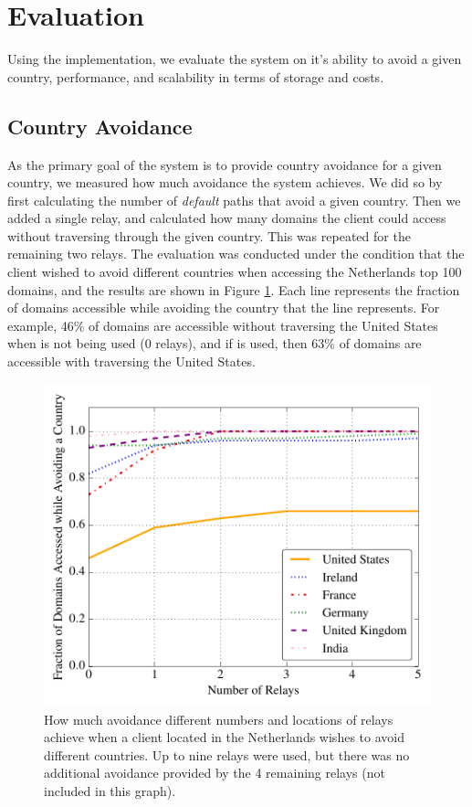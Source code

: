 \section{Evaluation}
Using the \system{} implementation, we evaluate the system on it's ability to avoid a given country, performance, and scalability in terms of storage and costs.

\subsection{Country Avoidance}
As the primary goal of the system is to provide country avoidance for a given 
country, we measured how much avoidance the system achieves.  We did so by first 
calculating the number of {\it default} paths that avoid a given country.  Then 
we added a single relay, and calculated how many domains the client could 
access without traversing through the given country.  This was repeated for 
the remaining two relays.  The evaluation was conducted under the condition that 
the client wished to avoid different countries when accessing the Netherlands top 
100 domains, and the results are shown in Figure \ref{fig:avoidance_eval}.  Each 
line represents the fraction of domains accessible while avoiding the country that 
the line represents.  For example, 46\% of domains are accessible without traversing 
the United States when \system{} is not being used (0 relays), and if \system{} is 
used, then 63\% of domains are accessible with traversing the United States.

\begin{figure}[b!]
\centering
\includegraphics[width=.5\textwidth]{avoidance_n_relays}
\caption{How much avoidance different numbers and locations of relays achieve when a 
client located in the Netherlands wishes to avoid different countries.  Up to nine 
relays were used, but there was no additional avoidance provided by the 4 remaining 
relays (not included in this graph).}
\label{fig:avoidance_eval}
\end{figure}

